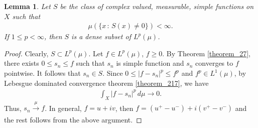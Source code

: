 \documentclass[11pt]{book}
\newtheorem{lemma}{Lemma}[chapter]
\theoremstyle{definition}
\numberwithin{equation}{chapter}
\begin{document}
\begin{lemma}
Let $S$ be the class of complex valued, measurable, simple functions on $X$ such that
\begin{align*}
    \mu \left(\{x \,:\, S(x) \neq 0 \}\right) < \infty.
\end{align*}
If $1 \leq p < \infty$, then $S$ is a dense subset of $L^p(\mu)$.
\end{lemma}
\begin{proof}
Clearly, $S \subset L^p(\mu)$. Let $f \in L^p(\mu)$, $f \geq 0$. By Theorem \ref{theorem_27}, there exists $0 \leq s_n \leq f$ such that $s_n$ is simple function and $s_n$ converges to $f$ pointwise. It follows that $s_n \in S$. Since $0 \leq \left|f - s_n\right|^p \leq f^p$ and $f^p \in L^1(\mu)$, by Lebesgue dominated convergence theorem \ref{theorem_217}, we have
\begin{align*}
    \int_X \left|f - s_n\right|^p \,d\mu \to 0.
\end{align*}
Thus, $s_n \xrightarrow[]{\mu} f$. In general, $f = u + iv$, then $f = (u^+ - u^-) + i(v^+ - v^-)$ and the rest follows from the above argument.
\end{proof}

\medskip
\end{document}
